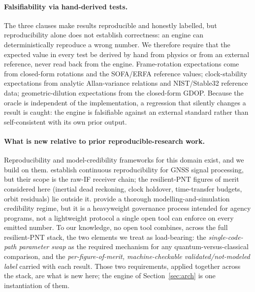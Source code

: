 \paragraph{Falsifiability via hand-derived tests.}
The three clauses make results reproducible and honestly labelled, but
reproducibility alone does not establish correctness: an engine can deterministically
reproduce a wrong number. We therefore require that the expected
value in every test be derived by hand from physics or from an external
reference, never read back from the engine. Frame-rotation expectations come
from closed-form rotations and the SOFA/ERFA reference values; clock-stability
expectations from analytic Allan-variance relations and NIST/Stable32 reference
data; geometric-dilution expectations from the closed-form GDOP. Because the
oracle is independent of the implementation, a regression that silently changes a
result is caught: the engine is falsifiable against an external standard rather
than self-consistent with its own prior output.

\paragraph{What is new relative to prior reproducible-research work.}
Reproducibility and model-credibility frameworks for this domain exist, and we
build on them. \citet{fernandezprades2018reproducibility} establish continuous
reproducibility for GNSS signal processing, but their scope is the raw-IF
receiver chain; the resilient-PNT figures of merit considered here (inertial
dead reckoning, clock holdover, time-transfer budgets, orbit residuals) lie
outside it. \citet{nasastd7009} provide a thorough modelling-and-simulation
credibility regime, but it is a heavyweight governance process intended for
agency programs, not a lightweight protocol a single open tool can enforce on
every emitted number. To our knowledge, no open tool combines, across the full
resilient-PNT stack, the two elements we treat as load-bearing: the
\emph{single-code-path parameter swap} as the required mechanism for any
quantum-versus-classical comparison, and the \emph{per-figure-of-merit,
machine-checkable validated/not-modeled label} carried with each result. Those
two requirements, applied together across the stack, are what is new here; the
engine of Section~\ref{sec:arch} is one instantiation of them.
